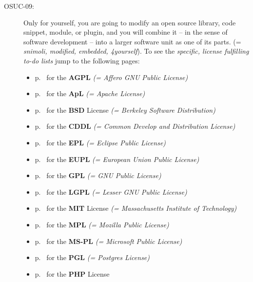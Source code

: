\begin{description}
\item[OSUC-09:]\label{OSUC-09-DEF} Only for yourself, you are going to modify an
open source library, code snippet, module, or plugin, and you will combine it
-- in the sense of software development -- into a larger software unit as one of
its parts. (= \textit{snimoli, modified, embedded, 4yourself}). 
To see the \textit{specific, license fulfilling to-do lists} jump to the
following pages:
  \begin{itemize}
    \item p.\ \pageref{OSUC-09-AGPL} for the \textbf{AGPL}
      \textit{(= Affero GNU Public License)} 
    \item p.\ \pageref{OSUC-09-Apache20} for the \textbf{ApL}
      \textit{(= Apache License)}
    \item p.\ \pageref{OSUC-09-BSD} for the \textbf{BSD} License
      \textit{(= Berkeley Software Distribution)}
    \item p.\ \pageref{OSUC-09-CDDL} for the \textbf{CDDL}
      \textit{(= Common Develop and Distribution License)}  
    \item p.\ \pageref{OSUC-09-EPL} for the \textbf{EPL}
      \textit{(= Eclipse Public License)}     
    \item p.\ \pageref{OSUC-09-EUPL} for the \textbf{EUPL}
      \textit{(= European Union Public License)} 
    \item p.\ \pageref{OSUC-09-GPL} for the \textbf{GPL}
       \textit{(= GNU Public License)} 
    \item p.\ \pageref{OSUC-09-LGPL} for the \textbf{LGPL}
      \textit{(= Lesser GNU Public License)}           
    \item p.\ \pageref{OSUC-09-MIT} for the \textbf{MIT} License
       \textit{(= Massachusetts Institute of Technology)} 
    \item p.\ \pageref{OSUC-09-MPL} for the \textbf{MPL}
      \textit{(= Mozilla Public License)}     
    \item p.\ \pageref{OSUC-09-MS-PL} for the \textbf{MS-PL}
      \textit{(= Microsoft Public License)} 
    \item p.\ \pageref{OSUC-09-PGL} for the \textbf{PGL}
      \textit{(= Postgres License)} 
    \item p.\ \pageref{OSUC-09-PHP} for the \textbf{PHP} License 
  \end{itemize}



\end{description}
